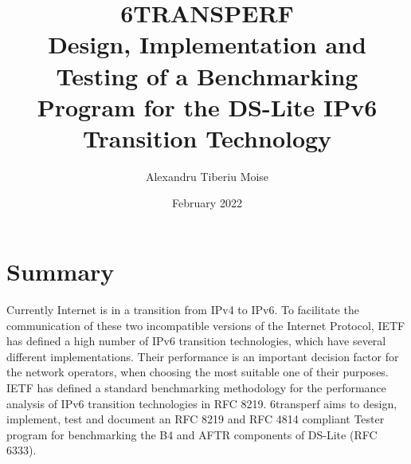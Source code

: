 \documentclass[a4paper,12p,titlepage]{article}
\begin{document}
\begin{titlepage}
\title{6TRANSPERF\\
\normalsize Design, Implementation and Testing of a Benchmarking Program for the DS-Lite IPv6 Transition Technology}
\author{Alexandru Tiberiu Moise}
\date{February 2022}
\end{titlepage}
\maketitle
\tableofcontents
\newpage

\section{Summary}
Currently Internet is in a transition from IPv4 to IPv6. To facilitate the communication of these two incompatible versions of the Internet Protocol, IETF has defined a high number of IPv6 transition technologies, which have several different implementations. Their performance is an important decision factor for the network operators, when choosing the most suitable one of their purposes. 
IETF has defined a standard benchmarking methodology for the performance analysis of IPv6 transition technologies in RFC 8219. 6transperf aims to design, implement, test and document an RFC 8219 and RFC 4814 compliant Tester program for benchmarking the B4 and AFTR components of DS-Lite (RFC 6333).
\end{document}
